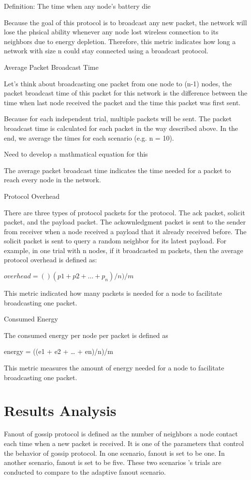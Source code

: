 Definition: The time when any node's battery die

Because the goal of this protocol is to broadcast any new packet, the network will lose the phsical ability whenever any node lost wireless connection to its neighbors due to energy depletion. Therefore, this metric indicates how long a network with size n could stay connected using a broadcast protocol.

Average Packet Broadcast Time

Let's think about broadcasting one packet from one node to (n-1) nodes, the packet broadcast time of this packet for this network is the difference between the time when last node received the packet and the time this packet was first sent.

Because for each independent trial, multiple packets will be sent. The packet broadcast time is calculated for each packet in the way described above. In the end, we average the times for each scenario (e.g. n = 10). 

Need to develop a mathmatical equation for this

The average packet broadcast time indicates the time needed for a packet to reach every node in the network.

Protocol Overhead

There are three types of protocol packets for the protocol. The ack packet, solicit packet, and the payload packet. The ackownledgment packet is sent to the sender from receiver when a node received a payload that it already received before. The solicit packet is sent to query a random neighbor for its latest payload. For example, in one trial with n nodes, if it broadcasted m packets, then the average protocol overhead is defined as:

$overhead = ()(p1 + p2 + … + p_n) / n) / m$

This metric indicated how many packets is needed for a node to facilitate broadcasting one packet. 

Consumed Energy

The consumed energy per node per packet is defined as

energy = ((e1 + e2 + … + en)/n)/m

This metric measures the amount of energy needed for a node to facilitate broadcasting one packet. 



\section{Results Analysis}
Fanout of gossip protocol is defined as the number of neighbors a node contact each time when a new packet is received. It is one of the parameters that control the behavior of gossip protocol. In one scenario, fanout is set to be one. In another scenario, fanout is set to be five. These two scenarios 's trials are conducted to compare to the adaptive fanout scenario. 


